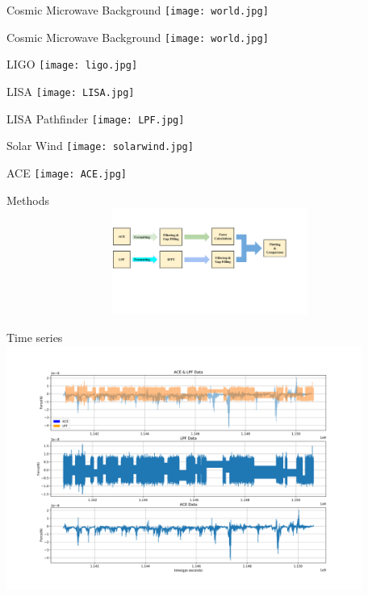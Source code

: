 \documentclass[aspectratio=169,xcolor=dvipsnames]{beamer}
\begin{document}
\begin{frame}{Cosmic Microwave Background}
   \centering
    \texttt{[image: world.jpg]}
\end{frame}
\begin{frame}{Cosmic Microwave Background}
   \centering
    \texttt{[image: world.jpg]}
\end{frame}
\begin{frame}{LIGO}
    \centering
    \texttt{[image: ligo.jpg]}
\end{frame}
\begin{frame}{LISA}
    \centering
    \texttt{[image: LISA.jpg]}
\end{frame}
\begin{frame}{LISA Pathfinder}
    \centering
    \texttt{[image: LPF.jpg]}
\end{frame}
\begin{frame}{Solar Wind}
    \centering
    \texttt{[image: solarwind.jpg]}
\end{frame}
\begin{frame}{ACE}
\centering
    \texttt{[image: ACE.jpg]}
\end{frame}
\begin{frame}{Methods}
\centering
    \includegraphics[height=3.5cm, width=14.5cm]{fig1solWmam.jpg}
\end{frame}
\begin{frame}{Time series}
    \centering
    \includegraphics[height=8cm]{TimeDomain_Comparison_ACEvLPF-1.png}
\end{frame}
\end{document}
